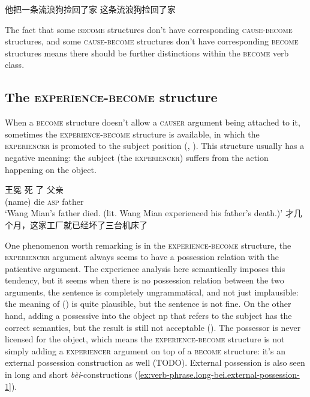 \documentclass[UTF8, a4paper, oneside, scheme=plain, 12pt]{ctexrep}
\newcommand{\form}[1]{\emph{#1}}
\newcommand{\translate}[1]{`#1'}
\newcommand*{\category}[1]{\textsc{#1}}
\begin{document}
\begin{exe}
    \ex 他把一条流浪狗捡回了家
    \ex *这条流浪狗捡回了家
\end{exe}

The fact that some \category{become} structures 
don't have corresponding \category{cause}-\category{become} structures,
and some \category{cause}-\category{become} structures 
don't have corresponding \category{become} structures
means there should be further distinctions 
within the \category{become} verb class.

\subsection{The \category{experience}-\category{become} structure}\label{sec:verb-phrase.experience}

When a \category{become} structure
doesn't allow a \category{causer} argument being attached to it,
sometimes the \category{experience}-\category{become} structure is available,
in which the \category{experiencer} is promoted to the subject position
(,
).
This structure usually has a negative meaning:
the subject (the \category{experiencer}) suffers from the action happening on the object.

\begin{exe}
    \ex\label{ex:verb-phrase.experience.1} \gll 王冕 死 了 父亲 \\
    (name) die \category{asp} father \\
    \glt \translate{Wang Mian's father died.
    (lit. Wang Mian experienced his father's death.)}
    \ex\label{ex:verb-phrase.experience.2} 才几个月，这家工厂就已经坏了三台机床了
\end{exe}

One phenomenon worth remarking 
is in the \category{experience}-\category{become} structure,
the \category{experiencer} argument 
always seems to have a possession relation 
with the patientive argument.
The experience analysis here semantically
imposes this tendency,
but it seems when there is no possession relation between the two arguments, 
the sentence is completely ungrammatical,
and not just implausible:
the meaning of ()
is quite plausible,
but the sentence is not fine.
On the other hand, 
adding a possessive into the object \acs{np}
that refers to the subject 
has the correct semantics,
but the result is still not acceptable
().
The possessor is never licensed for the object,
which means the \category{experience}-\category{become} structure 
is not simply adding a \category{experiencer} argument 
on top of a \category{become} structure:
it's an external possession construction as well (TODO).
External possession is also seen in 
long and short \form{bèi}-constructions
(\ref{ex:verb-phrase.long-bei.external-possession-1}).
\end{document}
